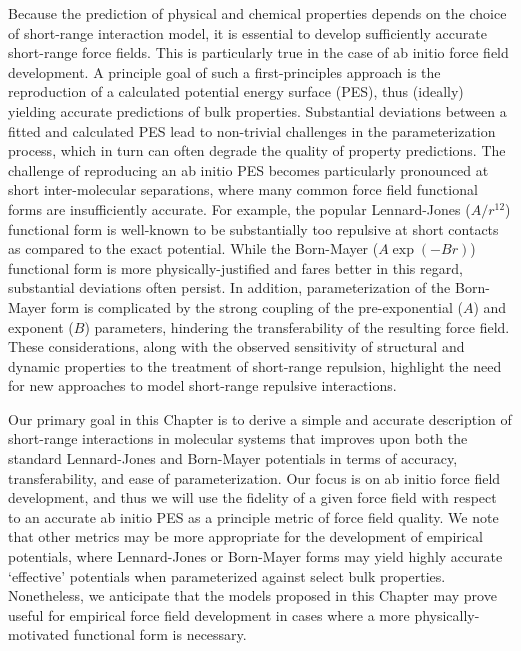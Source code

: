 Because the prediction of physical and chemical properties depends on
the choice of short-range interaction model,
\cite{Nezbeda2005,
Galliero2008,Gordon2006,Ruckenstein1997,Galliero2007,Wu2000,Errington1998,McGrath2010,
Parker2015,Sherrill2009,Zgarbova2010,
Bastea2003,Errington1999,Ross1980}
it is essential to develop sufficiently accurate short-range force fields.
This is particularly true in the case of ab initio force field development.
A principle goal
of such a first-principles approach is the reproduction of a calculated
potential energy surface (PES), thus (ideally) yielding accurate predictions
of bulk properties.
\cite{Schmidt2015}
 Substantial deviations between a fitted and calculated PES
lead to non-trivial challenges in the parameterization process, which
in turn can often degrade the quality of property predictions.
The challenge of reproducing an ab initio PES becomes particularly
pronounced at short inter-molecular separations, where many common force field
functional forms are insufficiently accurate.  For example, the popular
Lennard-Jones ($A/{r^{12}}$) functional form is well-known to be substantially
too repulsive at short contacts as compared to the exact
potential.
\cite{Abrahamson1963,Mackerell2004,Parker2015,Sherrill2009,Zgarbova2010}
While the Born-Mayer ($A\exp(-Br)$) functional form is more
physically-justified\cite{Buckingham1938} and fares
better in this regard,\cite{Abrahamson1963} substantial deviations often
persist.\cite{Halgren1992} In addition, parameterization of the Born-Mayer form
is complicated by the strong coupling of the pre-exponential ($A$) and exponent
($B$) parameters, hindering the transferability of the resulting force field.
These considerations, along with the observed sensitivity of
structural and dynamic properties to the treatment of short-range
repulsion,\cite{Nezbeda2005} highlight the need for new approaches
to model short-range repulsive interactions.

Our primary goal in this Chapter is to derive a simple and accurate description
of short-range interactions in molecular systems that improves upon both the
standard Lennard-Jones and Born-Mayer potentials in terms of accuracy,
transferability, and ease of parameterization. Our focus is on ab
initio force field development, and thus we will use the
fidelity of a given force field with respect to an accurate ab initio PES as a
principle metric of force field quality. We note
that other metrics may be more appropriate for the development of empirical
potentials, where Lennard-Jones or Born-Mayer forms may yield highly accurate
`effective' potentials when parameterized against select bulk properties.
Nonetheless, we anticipate that the models proposed in this Chapter may prove
useful for empirical force field development in cases where a more
physically-motivated functional form is necessary.
\cite{Parker2015,Sherrill2009,Zgarbova2010}

